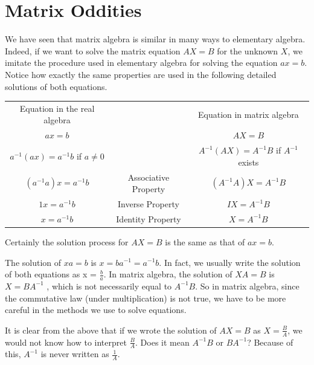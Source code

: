 \documentclass[10pt,]{book}
\theoremstyle{plain}
\theoremstyle{definition}
\theoremstyle{definition}
\theoremstyle{definition}
\theoremstyle{definition}
\begin{document}
\section[Matrix Oddities]{Matrix Oddities}\label{s-matrix-oddities}
We have seen that matrix algebra is similar in many ways to elementary algebra. Indeed, if we want to solve the matrix equation \(A X = B\) for the unknown \(X\), we imitate the procedure used in elementary algebra for solving the equation \(a x = b\). Notice how exactly the same properties are used in the following detailed solutions of both equations.%
\leavevmode%
\begin{table}
\centering
\begin{tabular}{ccc}
Equation in the real algebra& &Equation in  matrix algebra\tabularnewline[0pt]
\(a x = b\)&&\(A X = B\)\tabularnewline[0pt]
\(a^{-1}(a x) =a^{-1}b\) if \(a \neq  0\)&&\(A^{-1}(A X) = A^{-1}B\) if \(A^{-1 }\) exists\tabularnewline[0pt]
\(\left(a^{-1} a\right)x = a^{-1} b\)&Associative Property&\(\left(A^{-1} A\right)X = A^{-1} B\)\tabularnewline[0pt]
\(1x = a^{-1} b\)&Inverse Property&\(I X = A^{-1} B\)\tabularnewline[0pt]
\(x = a^{-1} b\)&Identity Property&\(X = A^{-1} B\) 
\end{tabular}
\end{table}
\par
Certainly the solution process for \(A X = B\) is the same as that of \(a x = b\).%
\par
The solution of \(x a = b\) is \(x = b a^{-1} = a^{-1}b\). In fact, we usually write the solution of both equations as x = \(\frac{b}{a}\). In matrix algebra, the solution of \(X A = B\) is \(X = B A^{-1}\) , which is not necessarily equal to \(A^{-1} B\). So in matrix algebra, since the commutative law (under multiplication) is not true, we have to be more careful in the methods we use to solve equations.%
\par
It is clear from the above that if we wrote the solution of \(A X = B\) as \(X=\frac{B}{A}\), we would not know how to interpret \(\frac{B}{A}\). Does it mean \(A^{-1} B\) or \(B A^{-1}\)?  Because of this, \(A^{-1}\) is never written as \(\frac{1}{A}\).%
\end{document}
